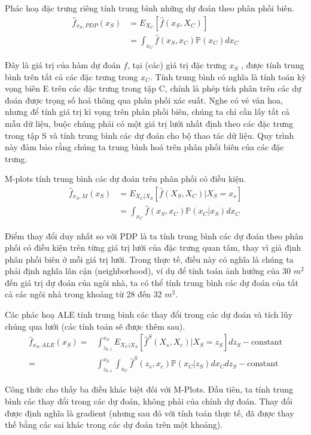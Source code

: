 Phác hoạ đặc trưng riêng tính trung bình những dự đoán theo phân phối biên.
\begin{align*}\hat{f}_{x_S,PDP}(x_S)&=E_{X_C}\left[\hat{f}(x_S,X_C)\right]\\&=\int_{x_C}\hat{f}(x_S,x_C)\mathbb{P}(x_C)d{}x_C\end{align*}

Đây là giá trị của hàm dự đoán $f$, tại (các) giá trị đặc trưng $x_S$ , được tính trung bình trên tất cả các đặc trưng trong $x_C$. Tính trung bình có nghĩa là tính toán kỳ vọng biên E trên các đặc trưng trong tập C, chính là phép tích phân trên các dự đoán được trọng số hoá thông qua phân phối xác suất. Nghe có vẻ văn hoa, nhưng để tính giá trị kì vọng trên phân phối biên, chúng ta chỉ cần lấy tất cả mẫu dữ liệu, buộc chúng phải có một giá trị lưới nhất định theo các đặc trưng trong tập S và tính trung bình các dự đoán cho bộ thao tác dữ liệu. Quy trình này đảm bảo rằng chúng ta trung bình hoá trên phân phối biên của các đặc trưng.

M-plots tính trung bình các dự đoán trên phân phối có điều kiện.
\begin{align*}\hat{f}_{x_S,M}(x_S)&=E_{X_C|X_S}\left[\hat{f}(X_S,X_C)|X_S=x_s\right]\\&=\int_{x_C}\hat{f}(x_S,x_C)\mathbb{P}(x_C|x_S)d{}x_C\end{align*}

Điểm thay đổi duy nhất so với PDP là ta tính trung bình các dự đoán theo phân phối có điều kiện trên từng giá trị lưới của đặc trưng quan tâm, thay vì giả định phân phối biên ở mỗi giá trị lưới. Trong thực tế, điều này có nghĩa là chúng ta phải định nghĩa lân cận (neighborhood), ví dụ để tính toán ảnh hưởng của 30 $m^2$ đến giá trị dự đoán của ngôi nhà, ta có thể tính trung bình các dự đoán của tất cả các ngôi nhà trong khoảng từ 28 đến 32 $m^2$.

Các phác hoạ ALE tính trung bình các thay đổi trong các dự đoán và tích lũy chúng qua lưới (các tính toán sẽ được thêm sau).
\begin{align*}\hat{f}_{x_S,ALE}(x_S)=&\int_{z_{0,1}}^{x_S}E_{X_C|X_S}\left[\hat{f}^S(X_s,X_c)|X_S=z_S\right]dz_S-\text{constant}\\=&\int_{z_{0,1}}^{x_S}\int_{x_C}\hat{f}^S(z_s,x_c)\mathbb{P}(x_C|z_S)d{}x_C{}dz_S-\text{constant}\end{align*}

Công thức cho thấy ba điều khác biệt đối với M-Plots. Đầu tiên, ta tính trung bình các thay đổi trong các dự đoán, không phải của chính dự đoán. Thay đổi được định nghĩa là gradient (nhưng sau đó với tính toán thực tế, đã được thay thế bằng các sai khác trong các dự đoán trên một khoảng).

